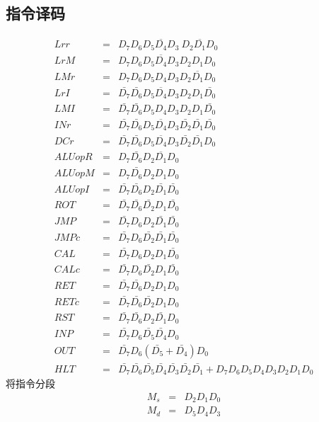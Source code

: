 \documentclass[10pt]{book}
\begin{document}
\subsection{指令译码}
\begin{eqnarray}
Lrr 	&=& D_{7}D_{6}\overline{D_{5}D_{4}D_{3}}~\overline{D_{2}D_{1}D_{0}} \\
LrM 	&=& D_{7}D_{6}\overline{D_{5}D_{4}D_{3}}D_{2}D_{1}D_{0} \\
LMr 	&=& D_{7}D_{6}D_{5}D_{4}D_{3}\overline{D_{2}D_{1}D_{0}} \\
LrI 	&=& \bar{D_{7}}\bar{D_{6}}\overline{D_{5}D_{4}D_{3}}D_{2}D_{1}\bar{D_{0}} \\
LMI 	&=& \bar{D_{7}}\bar{D_{6}}D_{5}D_{4}D_{3}D_{2}D_{1}\bar{D_{0}} \\
INr 	&=& \bar{D_{7}}\bar{D_{6}}\overline{D_{5}D_{4}D_{3}}\bar{D_{2}}\bar{D_{1}}\bar{D_{0}} \\
DCr 	&=& \bar{D_{7}}\bar{D_{6}}\overline{D_{5}D_{4}D_{3}}\bar{D_{2}}\bar{D_{1}}D_{0} \\
ALUopR 	&=& D_{7}\bar{D_{6}}\overline{D_{2}D_{1}D_{0}} \\
ALUopM 	&=& D_{7}\bar{D_{6}}D_{2}D_{1}D_{0} \\
ALUopI 	&=& \bar{D_{7}}\bar{D_{6}}D_{2}\bar{D_{1}}\bar{D_{0}} \\
ROT		&=& \bar{D_{7}}\bar{D_{6}}\bar{D_{2}}D_{1}\bar{D_{0}} \\
JMP		&=& \bar{D_{7}}D_{6}D_{2}\bar{D_{1}}\bar{D_{0}} \\
JMPc	&=& \bar{D_{7}}D_{6}\bar{D_{2}}\bar{D_{1}}\bar{D_{0}} \\
CAL		&=& \bar{D_{7}}D_{6}D_{2}D_{1}\bar{D_{0}} \\
CALc	&=& \bar{D_{7}}D_{6}\bar{D_{2}}D_{1}\bar{D_{0}} \\
RET		&=& \bar{D_{7}}\bar{D_{6}}D_{2}D_{1}D_{0} \\
RETc	&=& \bar{D_{7}}\bar{D_{6}}\bar{D_{2}}D_{1}D_{0} \\
RST		&=& \bar{D_{7}}\bar{D_{6}}D_{2}\bar{D_{1}}D_{0} \\
INP		&=& \bar{D_{7}}D_{6}\bar{D_{5}}\bar{D_{4}}D_{0} \\
OUT		&=& \bar{D_{7}}D_{6}(\bar{D_{5}}+\bar{D_{4}})D_{0} \\
HLT		&=& \bar{D_{7}}\bar{D_{6}}\bar{D_{5}}\bar{D_{4}}\bar{D_{3}}\bar{D_{2}}\bar{D_{1}}+D_{7}D_{6}D_{5}D_{4}D_{3}D_{2}D_{1}D_{0}
\end{eqnarray}
将指令分段
\begin{eqnarray}
M_s		&=& D_{2}D_{1}D_{0} \\
M_d		&=& D_{5}D_{4}D_{3}  
\end{eqnarray}
\end{document}
